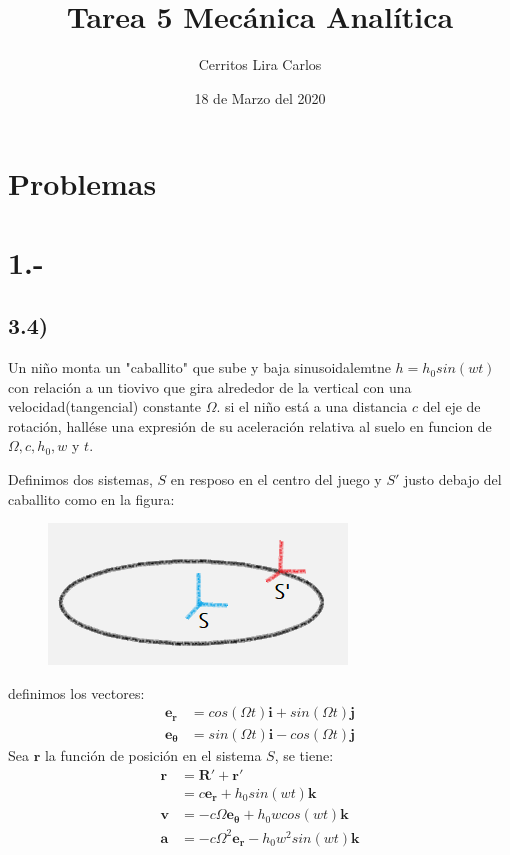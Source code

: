 \documentclass{article}
\title{Tarea 5 Mecánica Analítica}
\author{Cerritos Lira Carlos}
\date{18 de Marzo del 2020}
\begin{document}
\maketitle
\section*{Problemas}
\section*{1.-}
\subsection*{3.4)}
Un niño monta un "caballito" que sube y baja sinusoidalemtne $h=h_0sin(wt)$ con 
relación a un tiovivo que gira alrededor de la vertical con una velocidad(tangencial)
constante $\Omega$. si el niño está a una distancia $c$ del eje de rotación, 
hallése una expresión de su aceleración relativa al suelo en funcion de $\Omega, c, h_0, w$ 
y $t$. 
\begin{tcolorbox}[breakable]
    Definimos dos sistemas, $S$ en resposo en el centro del juego y $S'$ justo debajo del 
    caballito como en la figura:
    \begin{figure}[H]
        \centering
        \includegraphics[]{p1_horse.png}
    \end{figure}
    definimos los vectores:
    \begin{align*}
        \bm{e_r} &= cos(\Omega t) \bm{i} + sin(\Omega t) \bm{j} \\ 
        \bm{e_\theta} &= sin(\Omega t)\bm{i} - cos(\Omega t) \bm{j}
    \end{align*}
    Sea $\bm{r}$ la función de posición en el sistema $S$, se tiene:
    \begin{align*}
        \bm{r} 
        &= \bm{R'} + \bm{r'} \\
        &= c\bm{e_r} + h_0sin(wt)\bm{k} \\
        \bm{v} &= -c\Omega\bm{e_\theta} + h_0wcos(wt)\bm{k} \\
        \bm{a} &= -c\Omega^2\bm{e_r} - h_0w^2sin(wt)\bm{k} \\
    \end{align*}
\end{tcolorbox}
\end{document}
